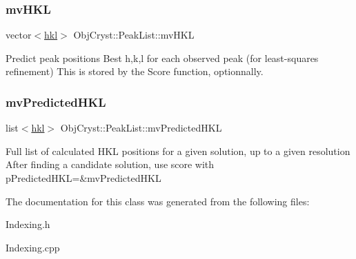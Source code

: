 \subsubsection{\texorpdfstring{mvHKL}{mvHKL}}
{\footnotesize\ttfamily vector$<$\mbox{\hyperlink{struct_obj_cryst_1_1_peak_list_1_1hkl}{hkl}}$>$ Obj\+Cryst\+::\+Peak\+List\+::mv\+H\+KL\hspace{0.3cm}{\ttfamily [mutable]}}

Predict peak positions Best h,k,l for each observed peak (for least-\/squares refinement) This is stored by the Score function, optionnally. \mbox{\label{class_obj_cryst_1_1_peak_list_a7e3d44332948bcd9565089aa8172c009}} 
\subsubsection{\texorpdfstring{mvPredictedHKL}{mvPredictedHKL}}
{\footnotesize\ttfamily list$<$\mbox{\hyperlink{struct_obj_cryst_1_1_peak_list_1_1hkl}{hkl}}$>$ Obj\+Cryst\+::\+Peak\+List\+::mv\+Predicted\+H\+KL\hspace{0.3cm}{\ttfamily [mutable]}}

Full list of calculated H\+KL positions for a given solution, up to a given resolution After finding a candidate solution, use score with p\+Predicted\+H\+KL=\&mv\+Predicted\+H\+KL 

The documentation for this class was generated from the following files\+:\begin{DoxyCompactItemize}
\item 
Indexing.\+h\item 
Indexing.\+cpp\end{DoxyCompactItemize}
